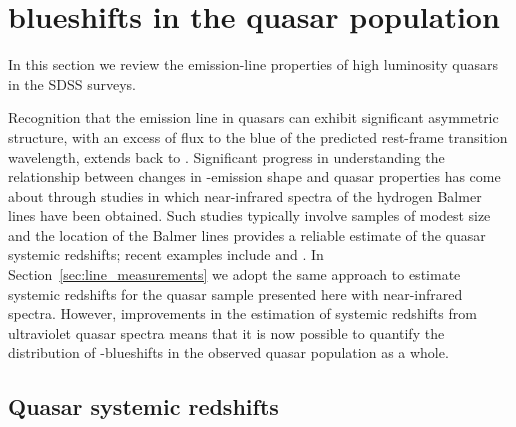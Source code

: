 

\section{ blueshifts in the quasar population}
\label{sec:blueshifts}

In this section we review the  emission-line properties of high luminosity quasars in the SDSS surveys. 

Recognition that the  emission line in quasars can exhibit significant asymmetric structure, with an excess of flux to the blue of the predicted rest-frame transition wavelength, extends back to \citet{gaskell82}. 
Significant progress in understanding the relationship between changes in -emission shape and quasar properties has come about through studies in which near-infrared spectra of the hydrogen Balmer lines have been obtained. 
Such studies typically involve samples of modest size and the location of the Balmer lines provides a reliable estimate of the quasar systemic redshifts; recent examples include \citet{shen12} and \citet{marziani16}. 
In Section~\ref{sec:line_measurements} we adopt the same approach to estimate systemic redshifts for the quasar sample presented here with near-infrared spectra.  
However, improvements in the estimation of systemic redshifts from ultraviolet quasar spectra means that it is now possible to quantify the distribution of -blueshifts in the observed quasar population as a whole. 

\subsection{Quasar systemic redshifts}
\label{sub:sysredshifts}

